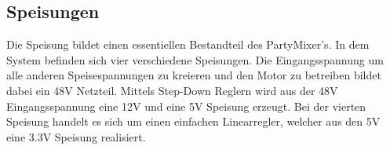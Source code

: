 \subsection{Speisungen}
\label{subsec:Speisungen}

Die Speisung bildet einen essentiellen Bestandteil des PartyMixer's. In dem System befinden sich vier verschiedene Speisungen. Die Eingangsspannung um alle anderen Speisespannungen zu kreieren und den Motor zu betreiben bildet dabei ein 48V Netzteil. Mittels Step-Down Reglern wird aus der 48V Eingangsspannung eine 12V und eine 5V Speisung erzeugt. Bei der vierten Speisung handelt es sich um einen einfachen Linearregler, welcher aus den 5V eine 3.3V Speisung realisiert. 